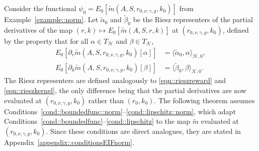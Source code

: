 \documentclass[12pt]{article}
\theoremstyle{plain}
\begin{document}
Consider the functional
$\psi_0 = E_0[\tilde{m}(A,S,r_{0,\nu,\gamma,g},k_0)]$ from Example~\ref{example::norm}.  
Let $\tilde{\alpha}_0$ and $\tilde{\beta}_{0}$ be the Riesz representers of the partial derivatives of the map $(r,k) \mapsto E_0[\tilde{m}(A,S,r,k)]$ at $(r_{0,\nu,\gamma,g}, k_0)$, defined by the property that for all $\alpha \in T_{\mathcal{H}}$ and $\beta \in T_{\mathcal{K}}$,
\begin{align*}
      E_0[\partial_r \tilde{m}(A,S,r_{0,\nu,\gamma,g},k_0)[\alpha]]
      &= \langle \tilde{\alpha}_0, \alpha \rangle_{\mathcal{H}, 0}, \\
      E_0[\partial_k \tilde{m}(A,S,r_{0,\nu,\gamma,g},k_0)[\beta]]
      &= \langle \tilde{\beta}_{0}, \beta \rangle_{\mathcal{K}, 0}.
\end{align*}
The Riesz representers are defined analogously to \eqref{eqn::rieszreward} and \eqref{eqn::rieszkernel}, the only difference being that the partial derivatives are now evaluated at $(r_{0,\nu,\gamma,g}, k_0)$ rather than $(r_0, k_0)$.  
The following theorem assumes Conditions~\ref{cond::boundedfunc::norm}--\ref{cond::lipschitz::norm}, which adapt Conditions~\ref{cond::boundedfunc}--\ref{cond::lipschitz} to the map $\tilde{m}$ evaluated at $(r_{0,\nu,\gamma,g}, k_0)$.  
Since these conditions are direct analogues, they are stated in Appendix~\ref{appendix::conditionsEIFnorm}.
\end{document}
